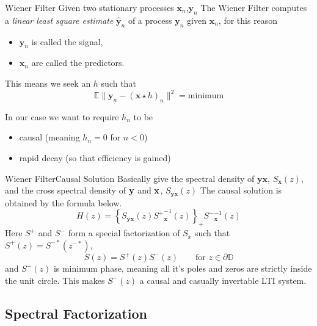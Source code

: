 \documentclass{beamer}  %
\newcommand{\E}{\mathbb{E}}
\newcommand{\D}{\mathbb{D}}
\begin{document}
\begin{frame}{Wiener Filter}
	Given two stationary processes $\textbf{x}_n$,$\textbf{y}_n$ The Wiener Filter computes a \emph{linear least square estimate} $\hat{\textbf{y}}_n$ of a process $\textbf{y}_n$ given  $\textbf{x}_n$, for this reason  
	\begin{itemize}
		\item $\textbf{y}_n$ is called the signal,
		\item $\textbf{x}_n$ are called the predictors.
	\end{itemize}

	This means we seek an $h$ such that
	$$\E\|\textbf{y}_n - (\textbf{x}\star h)_n\|^2 = \text{minimum}$$
	
	In our case we want to require $h_n$ to be 
	\begin{itemize}
		\item causal (meaning $h_n=0$ for $n<0$)
		\item rapid decay (so that efficiency is gained)
	\end{itemize}
	
\end{frame}



\begin{frame}{Wiener Filter}{Causal Solution}
	Basically give the spectral density of  ${\textbf{yx}}$, $S_{\textbf{x}}(z)$, and the cross spectral density of ${\bf y}$ and ${\bf x}$, $S_{\textbf{yx}}(z)$ The causal solution is obtained by the formula below.
	$$H(z) = \left\{S_{\textbf{yx}}(z){S^+}^{-1}_{\textbf{x}}(z)\right\}_+ {S^-}^{-1}_{\textbf{x}}(z)$$
	Here ${S^+}$ and ${S^-}$ form a special factorization of $S_x$ such that $S^+(z) = S^{-*}(z^{-*})$,
	$$S(z) =S^+(z)S^-(z)\qquad \text{for }z\in \partial\D$$
	and $S^-(z)$ is minimum phase, meaning all it's poles and zeros are strictly inside the unit circle. This makes  $S^-(z)$ a causal and casually invertable LTI system. 
\end{frame}

\subsection{Spectral Factorization}
\end{document}
